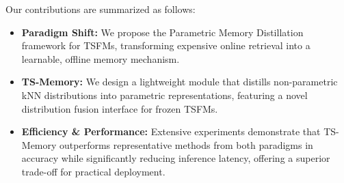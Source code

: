 Our contributions are summarized as follows:
\begin{itemize}[leftmargin=*]
    \item \textbf{Paradigm Shift:} We propose the Parametric Memory Distillation framework for TSFMs, transforming expensive online retrieval into a learnable, offline memory mechanism.
    
    \item \textbf{TS-Memory:} We design a lightweight module that distills non-parametric kNN distributions into parametric representations, featuring a novel distribution fusion interface for frozen TSFMs.
    
    \item \textbf{Efficiency \& Performance:} Extensive experiments demonstrate that TS-Memory outperforms representative methods from both paradigms in accuracy while significantly reducing inference latency, offering a superior trade-off for practical deployment.
\end{itemize}

